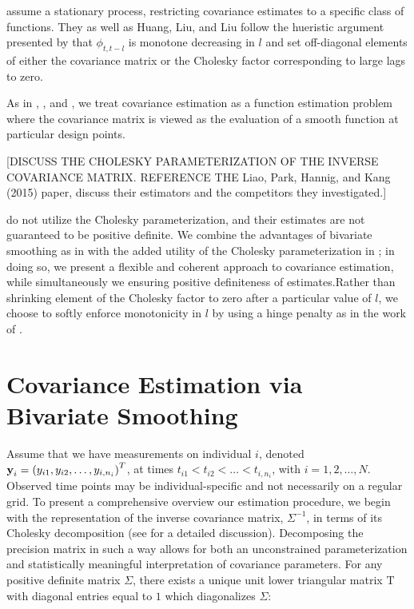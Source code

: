\documentclass[12pt]{article}
\newcommand*\needsparaphrased{\color{red}}
\newcommand{\bfy}{\mbox{\bf y}}
\newcommand{\matT}{\mbox{T}}
\begin{document}
\citet{kaufman2008covariance} assume a stationary process, restricting covariance estimates to a specific class of functions. They as well as  Huang, Liu, and Liu \cite{huang2007estimation} follow the hueristic argument presented by \cite{pourahmadi1999joint} that $\phi_{t,t-l}$ is monotone decreasing in $l$ and set off-diagonal elements of either the covariance matrix or the Cholesky factor corresponding to large lags to zero. 

As in \citet{huang2007estimation}, \citet{kaufman2008covariance}, and \citet{yao2005functional}, we treat covariance estimation as a function estimation problem where the covariance matrix is viewed as the evaluation of a smooth function at particular design points. 

{\needsparaphrased[DISCUSS THE CHOLESKY PARAMETERIZATION OF THE INVERSE COVARIANCE MATRIX. REFERENCE THE Liao, Park, Hannig, and Kang (2015) paper, discuss their estimators and the competitors they investigated.]}



\citet{yao2005functional} do not utilize the Cholesky parameterization, and their estimates are not guaranteed to be positive definite.  We combine the advantages of bivariate smoothing as in \citet{yao2005functional} with the added utility of the Cholesky parameterization in \citet{huang2007estimation}; in doing so, we present a flexible and coherent approach to covariance estimation, while simultaneously we ensuring positive definiteness of estimates.Rather than shrinking element of the Cholesky factor to zero after a particular value of $l$, we choose to softly enforce monotonicity in $l$ by using a hinge penalty as in the work of \citet{tibshirani2011nearly}. 

\section{Covariance Estimation via Bivariate Smoothing}

Assume that we have measurements on individual $i$, denoted $\bfy_i = \left( y_{i1}, y_{i2}, \dots, y_{i,n_i} \right)^T$, at times $t_{i1} < t_{i2} < \dots< t_{i,n_i}$, with $i=1,2,\dots,N$. Observed time points may be individual-specific and not necessarily on a regular grid. To present a comprehensive overview our estimation procedure, we begin with the representation of the inverse covariance matrix, $\Sigma^{-1}$, in terms of its Cholesky decomposition (see \citet{pourahmadi2007cholesky} for a detailed discussion). Decomposing the precision matrix in such a way allows for both an unconstrained parameterization and statistically meaningful interpretation of covariance parameters. For any positive definite matrix $\Sigma$, there exists a unique unit lower triangular matrix $\matT$ with diagonal entries equal to $1$ which diagonalizes $\Sigma$:
\end{document}

